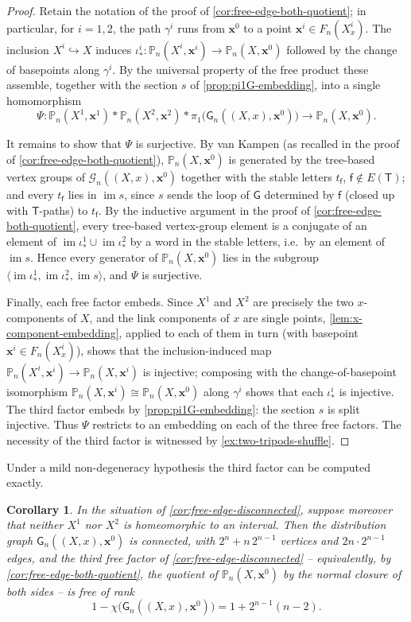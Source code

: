 \documentclass[reqno]{amsart}
\newtheorem{corollary}[theorem]{Corollary}
\theoremstyle{definition}
\newcommand\bfx{\mathbf{x}}
\newcommand\cG{\mathcal{G}}
\newcommand\sfG{\mathsf{G}}
\newcommand\sfT{\mathsf{T}}
\newcommand\sff{\mathsf{f}}
\newcommand{\PB}{\mathbb{P}}
\newcommand{\im}{\operatorname{im}}
\newcommand{\base}{\bfx^0}
\numberwithin{equation}{section}
\begin{document}
\begin{proof}
Retain the notation of the proof of
\cref{cor:free-edge-both-quotient}; in particular, for \(i=1,2\),
the path \(\gamma^i\) runs from
\(\base\) to a point \(\bfx^i\in F_n(X^i_x)\). 
The
inclusion \(X^i\hookrightarrow X\) induces
\(\iota^i_\ast\colon\PB_n(X^i,\bfx^i)\to\PB_n(X,\base)\) followed by the change of basepoints along \(\gamma^i\).
By
the universal property of the free product these assemble, together
with the section \(s\) of \cref{prop:pi1G-embedding}, into a
single homomorphism
\[
\Psi\colon\PB_n(X^1,\bfx^1)\ast\PB_n(X^2,\bfx^2)\ast
\pi_1\bigl(\sfG_n((X,x),\base)\bigr)\longrightarrow
\PB_n(X,\base) .
\]

It remains to show that \(\Psi\) is surjective. By van Kampen (as
recalled in the proof of \cref{cor:free-edge-both-quotient}),
\(\PB_n(X,\base)\) is generated by the tree-based vertex groups of
\(\cG_n((X,x),\base)\) together with the stable letters \(t_\sff\),
\(\sff\notin E(\sfT)\); and every \(t_\sff\) lies in \(\im s\), since \(s\)
sends the loop of \(\sfG\) determined by \(\sff\) (closed up with
\(\sfT\)-paths) to \(t_\sff\). By the inductive argument in the proof
of \cref{cor:free-edge-both-quotient}, every tree-based
vertex-group element is a conjugate of an element of
\(\im\iota^1_\ast\cup\im\iota^2_\ast\) by a word in the stable
letters, i.e.\ by an element of \(\im s\). Hence every generator of
\(\PB_n(X,\base)\) lies in the subgroup
\(\langle\im\iota^1_\ast,\im\iota^2_\ast,\im s\rangle\), and
\(\Psi\) is surjective.

Finally, each free factor embeds. Since \(X^1\) and \(X^2\) are
precisely the two \(x\)-components of \(X\), and the link
components of \(x\) are single points,
\cref{lem:x-component-embedding}, applied to each of them
in turn (with basepoint \(\bfx^i\in F_n(X^i_x)\)), shows that the
inclusion-induced map
\(\PB_n(X^i,\bfx^i)\to\PB_n(X,\bfx^i)\) is injective; composing with
the change-of-basepoint isomorphism
\(\PB_n(X,\bfx^i)\cong\PB_n(X,\base)\) along \(\gamma^i\) shows that
each \(\iota^i_\ast\) is injective. The third factor embeds by
\cref{prop:pi1G-embedding}: the section \(s\) is split injective.
Thus \(\Psi\) restricts to an embedding on each of the three free
factors. The necessity of the third factor is witnessed by
\cref{ex:two-tripods-shuffle}.
\end{proof}

Under a mild non-degeneracy hypothesis the third factor can be
computed exactly.

\begin{corollary}\label{cor:free-edge-loop-rank}
In the situation of \cref{cor:free-edge-disconnected}, suppose
moreover that neither \(X^1\) nor \(X^2\) is homeomorphic to an
interval. Then the distribution graph \(\sfG_n((X,x),\base)\) is
connected, with \(2^n+n\,2^{n-1}\) vertices and \(2n\cdot2^{n-1}\)
edges, and the third free factor of
\cref{cor:free-edge-disconnected} -- equivalently, by
\cref{cor:free-edge-both-quotient}, the quotient of
\(\PB_n(X,\base)\) by the normal closure of both sides -- is free
of rank
\[
1-\chi\bigl(\sfG_n((X,x),\base)\bigr)=1+2^{n-1}(n-2).
\]
\end{corollary}
\end{document}

